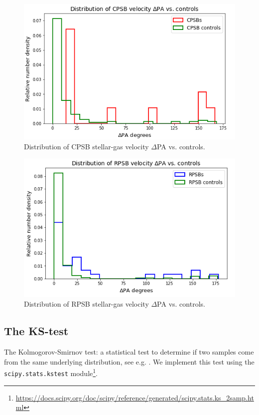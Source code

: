 \begin{figure}
    \centering
    \includegraphics[width=\columnwidth]{images/JupyterPlots/Distribution-of-CPSB-dPA-vs-controls.png}
    \caption{Distribution of CPSB stellar-gas velocity $\Delta$PA vs. controls.}
    \label{fig:CPSBvsControlDeltaPAs}
\end{figure}

\begin{figure}
    \centering
    \includegraphics[width=\columnwidth]{images/JupyterPlots/Distribution-of-RPSB-dPA-vs-controls.png}
    \caption{Distribution of RPSB stellar-gas velocity $\Delta$PA vs. controls.}
    \label{fig:RPSBvsControlDeltaPAs}
\end{figure}

\subsection{The KS-test}
The Kolmogorov-Smirnov test: a statistical test to determine if two samples come from the same underlying distribution, see e.g. \citet{hodges1958significance}. We implement this test using the \texttt{scipy.stats.kstest} module\footnote{\href{}{https://docs.scipy.org/doc/scipy/reference/generated/scipy.stats.ks\_2samp.html}}.

